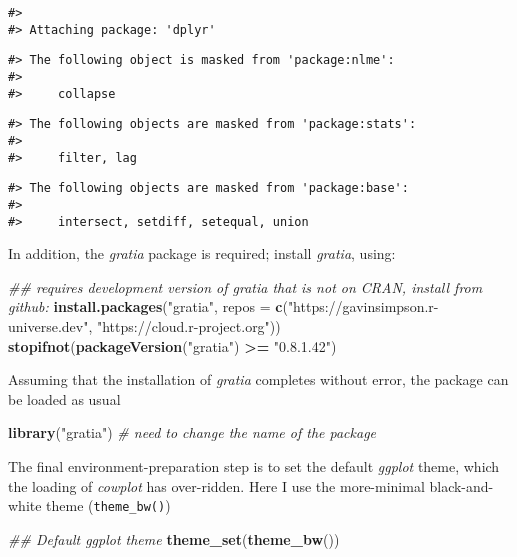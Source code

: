\documentclass[12pt,]{article}
\newenvironment{Shaded}{\begin{snugshade}}{\end{snugshade}}
\newcommand{\CommentTok}[1]{\textcolor[rgb]{0.56,0.35,0.01}{\textit{#1}}}
\newcommand{\DataTypeTok}[1]{\textcolor[rgb]{0.13,0.29,0.53}{#1}}
\newcommand{\KeywordTok}[1]{\textcolor[rgb]{0.13,0.29,0.53}{\textbf{#1}}}
\newcommand{\NormalTok}[1]{#1}
\newcommand{\OperatorTok}[1]{\textcolor[rgb]{0.81,0.36,0.00}{\textbf{#1}}}
\newcommand{\StringTok}[1]{\textcolor[rgb]{0.31,0.60,0.02}{#1}}
\begin{document}
\begin{verbatim}
#> 
#> Attaching package: 'dplyr'
\end{verbatim}

\begin{verbatim}
#> The following object is masked from 'package:nlme':
#> 
#>     collapse
\end{verbatim}

\begin{verbatim}
#> The following objects are masked from 'package:stats':
#> 
#>     filter, lag
\end{verbatim}

\begin{verbatim}
#> The following objects are masked from 'package:base':
#> 
#>     intersect, setdiff, setequal, union
\end{verbatim}

In addition, the \emph{gratia} package is required; install
\emph{gratia}, using:

\begin{Shaded}
\begin{Highlighting}[]
\CommentTok{## requires development version of gratia that is not on CRAN, install from github:}
\KeywordTok{install.packages}\NormalTok{(}\StringTok{"gratia"}\NormalTok{, }\DataTypeTok{repos =} \KeywordTok{c}\NormalTok{(}\StringTok{"https://gavinsimpson.r-universe.dev"}\NormalTok{,}
    \StringTok{"https://cloud.r-project.org"}\NormalTok{))}
\KeywordTok{stopifnot}\NormalTok{(}\KeywordTok{packageVersion}\NormalTok{(}\StringTok{"gratia"}\NormalTok{) }\OperatorTok{>=}\StringTok{ "0.8.1.42"}\NormalTok{)}
\end{Highlighting}
\end{Shaded}

Assuming that the installation of \emph{gratia} completes without error,
the package can be loaded as usual

\begin{Shaded}
\begin{Highlighting}[]
\KeywordTok{library}\NormalTok{(}\StringTok{"gratia"}\NormalTok{) }\CommentTok{# need to change the name of the package}
\end{Highlighting}
\end{Shaded}

The final environment-preparation step is to set the default
\emph{ggplot} theme, which the loading of \emph{cowplot} has
over-ridden. Here I use the more-minimal black-and-white theme
(\texttt{theme\_bw()})

\begin{Shaded}
\begin{Highlighting}[]
\CommentTok{## Default ggplot theme}
\KeywordTok{theme_set}\NormalTok{(}\KeywordTok{theme_bw}\NormalTok{())}
\end{Highlighting}
\end{Shaded}
\end{document}

